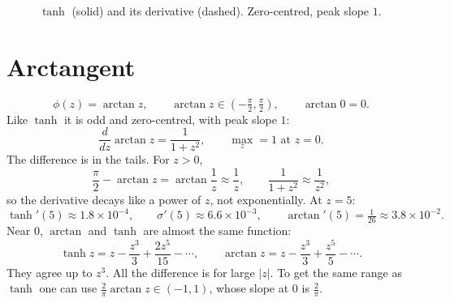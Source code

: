 \documentclass[11pt]{article}
\newcommand{\axes}[4]{%
  \draw[->] (#1,0) -- (#2,0) node[right] {$z$};
  \draw[->] (0,#3) -- (0,#4);
  \foreach \t in {-4,-2,2,4} \draw (\t,0.04) -- (\t,-0.04) node[below] {\scriptsize $\t$};
}
\begin{document}
\begin{figure}[H]
\centering
{}
\caption{$\tanh$ (solid) and its derivative (dashed). Zero-centred, peak slope $1$.}
\end{figure}

\section{Arctangent}

\begin{equation}
  \phi(z)=\arctan z, \qquad \arctan z\in\left(-\tfrac{\pi}{2},\tfrac{\pi}{2}\right), \qquad \arctan 0=0 .
\end{equation}
Like $\tanh$ it is odd and zero-centred, with peak slope $1$:
\begin{equation}
  \frac{d}{dz}\arctan z=\frac{1}{1+z^2}, \qquad \max_z=1 \text{ at } z=0 .
\end{equation}
The difference is in the tails. For $z>0$,
\begin{equation}
  \frac{\pi}{2}-\arctan z=\arctan\frac1z\approx\frac1z,
  \qquad \frac{1}{1+z^2}\approx\frac{1}{z^2},
\end{equation}
so the derivative decays like a power of $z$, not exponentially. At $z=5$:
\begin{equation}
  \tanh'(5)\approx1.8\times10^{-4}, \qquad
  \sigma'(5)\approx6.6\times10^{-3}, \qquad
  \arctan'(5)=\tfrac{1}{26}\approx3.8\times10^{-2}.
\end{equation}
Near $0$, $\arctan$ and $\tanh$ are almost the same function:
\begin{equation}
  \tanh z = z-\frac{z^3}{3}+\frac{2z^5}{15}-\cdots, \qquad
  \arctan z = z-\frac{z^3}{3}+\frac{z^5}{5}-\cdots .
  \label{eq:taylor}
\end{equation}
They agree up to $z^3$. All the difference is for large $|z|$.
To get the same range as $\tanh$ one can use $\tfrac{2}{\pi}\arctan z\in(-1,1)$, whose slope at $0$ is $\tfrac{2}{\pi}$.
\end{document}
